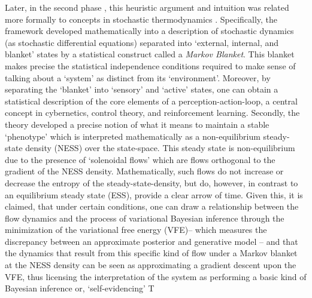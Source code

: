 Later, in the second phase \citep{friston2013life}, this heuristic argument and intuition was related more formally to concepts in stochastic thermodynamics \citep{friston2012ao,friston2012free}. Specifically, the framework developed mathematically into a description of stochastic dynamics (as stochastic differential equations) separated into `external, internal, and blanket' states by a statistical construct called a \emph{Markov Blanket}. This blanket makes precise the statistical independence conditions required to make sense of talking about a `system' as distinct from its `environment'. Moreover, by separating the `blanket' into `sensory' and `active' states, one can obtain a statistical description of the core elements of a perception-action-loop, a central concept in cybernetics, control theory, and reinforcement learning. Secondly, the theory developed a precise notion of what it means to maintain a stable `phenotype' which is interpreted mathematically as a non-equilibrium steady-state density (NESS) over the state-space. This steady state is non-equilibrium due to the presence of `solenoidal flows' which are flows orthogonal to the gradient of the NESS density. Mathematically, such flows do not increase or decrease the entropy of the steady-state-density, but do, however, in contrast to an equilibrium steady state (ESS), provide a clear arrow of time. Given this, it is claimed, that under certain conditions, one can draw a relationship between the flow dynamics and the process of variational Bayesian inference through the minimization of the variational free energy (VFE)-- which measures the discrepancy between an approximate posterior and generative model -- and that the dynamics that result from this specific kind of flow under a Markov blanket at the NESS density can be seen as approximating a gradient descent upon the VFE, thus licensing the interpretation of the system as performing a basic kind of Bayesian inference or, `self-evidencing' T \citep{hohwy2008predictive,clark2015surfing}

